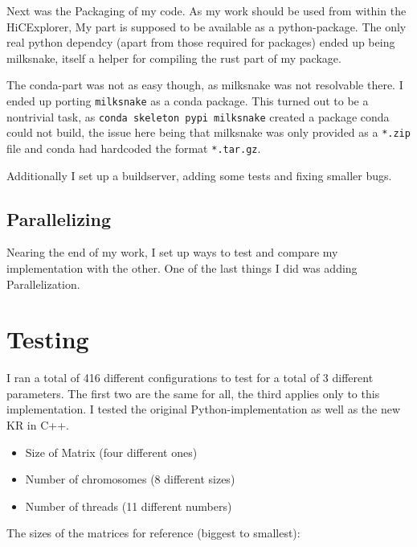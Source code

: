 Next was the Packaging of my code. As my work should be used from within the
HiCExplorer, My part is supposed to be available as a python-package. The only
real python dependcy (apart from those required for packages) ended up being
milksnake, itself a helper for compiling the rust part of my package.

The conda-part was not as easy though, as milksnake was not resolvable there. I
ended up porting \verb|milksnake| as a conda package. This turned out to be a
nontrivial task, as \verb|conda skeleton pypi milksnake| created a package
conda could not build, the issue here being that milksnake was only provided as
a \verb|*.zip| file and conda had hardcoded the format \verb|*.tar.gz|.

Additionally I set up a buildserver, adding some tests and fixing smaller bugs.


\subsection{Parallelizing}

Nearing the end of my work, I set up ways to test and compare my implementation
with the other. One of the last things I did was adding Parallelization.



\section{Testing}\label{sec:testing}
I ran a total of 416 different configurations to test for a total of 3
different parameters. The first two are the same for all, the third applies
only to this implementation. I tested the original Python-implementation as
well as the new KR in C++.

\begin{itemize}
    \item Size of Matrix (four different ones)
    \item Number of chromosomes (8 different sizes)
    \item Number of threads (11 different numbers)
\end{itemize}

\newpage
The sizes of the matrices for reference (biggest to smallest):

